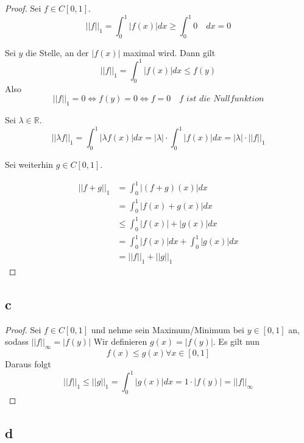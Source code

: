 \documentclass[10pt,a4paper]{article}
\begin{document}
\begin{proof}
Sei $f \in C[0, 1]$.
\begin{equation}
||f||_{1} = \int_{0}^{1} |f(x)| dx \ge \int_{0}^{1} 0 \quad dx = 0
\end{equation}

Sei $y$ die Stelle, an der $|f(x)|$ maximal wird.
Dann gilt
\begin{equation}
||f||_{1} = \int_{0}^{1} |f(x)| dx \le f(y)
\end{equation}
Also
\begin{equation}
||f||_{1} = 0 \Leftrightarrow f(y) = 0 \Leftrightarrow f = 0 \quad \textit{$f$ ist die Nullfunktion}
\end{equation}

Sei $\lambda \in \mathbb{R}$.
\begin{equation}
||\lambda f||_{1} = \int_{0}^{1} |\lambda f(x)| dx = |\lambda| \cdot \int_{0}^{1} |f(x)| dx = |\lambda| \cdot ||f||_{1}
\end{equation}

Sei weiterhin $g \in C[0, 1]$.

\begin{align}
||f + g||_{1} & = \int_{0}^{1} |(f + g)(x)| dx\\
& = \int_{0}^{1} |f(x) + g(x)| dx\\
& \le \int_{0}^{1} |f(x)| + |g(x)| dx\\
& = \int_{0}^{1} |f(x)| dx + \int_{0}^{1} |g(x)| dx\\
& = ||f||_{1} + ||g||_{1}
\end{align}
\end{proof}

\subsection*{c}

\begin{proof}
Sei $f \in C[0, 1]$ und nehme sein Maximum/Minimum bei $y \in [0, 1]$ an, sodass $||f||_{\infty} = |f(y)|$
Wir definieren $g(x) = |f(y)|$.
Es gilt nun
\begin{equation}
f(x) \le g(x) \forall x \in [0, 1]
\end{equation}
Daraus folgt
\begin{equation}
||f||_{1} \le ||g||_{1} = \int_{0}^{1} |g(x)| dx = 1 \cdot |f(y)| = ||f||_{\infty}
\end{equation}
\end{proof}

\subsection*{d}
\end{document}
